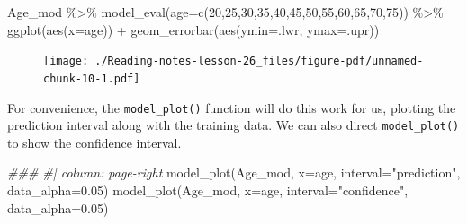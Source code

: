 \documentclass[
  letterpaper,
  DIV=11,
  numbers=noendperiod,
  oneside]{scrreprt}
\newenvironment{Shaded}{\begin{snugshade}}{\end{snugshade}}
\newcommand{\AttributeTok}[1]{\textcolor[rgb]{0.40,0.45,0.13}{#1}}
\newcommand{\DecValTok}[1]{\textcolor[rgb]{0.68,0.00,0.00}{#1}}
\newcommand{\DocumentationTok}[1]{\textcolor[rgb]{0.37,0.37,0.37}{\textit{#1}}}
\newcommand{\FloatTok}[1]{\textcolor[rgb]{0.68,0.00,0.00}{#1}}
\newcommand{\FunctionTok}[1]{\textcolor[rgb]{0.28,0.35,0.67}{#1}}
\newcommand{\NormalTok}[1]{\textcolor[rgb]{0.00,0.23,0.31}{#1}}
\newcommand{\SpecialCharTok}[1]{\textcolor[rgb]{0.37,0.37,0.37}{#1}}
\newcommand{\StringTok}[1]{\textcolor[rgb]{0.13,0.47,0.30}{#1}}
\begin{document}
\begin{tcolorbox}
\begin{Shaded}
\begin{Highlighting}[]
\NormalTok{Age\_mod }\SpecialCharTok{\%\textgreater{}\%} 
  \FunctionTok{model\_eval}\NormalTok{(}\AttributeTok{age=}\FunctionTok{c}\NormalTok{(}\DecValTok{20}\NormalTok{,}\DecValTok{25}\NormalTok{,}\DecValTok{30}\NormalTok{,}\DecValTok{35}\NormalTok{,}\DecValTok{40}\NormalTok{,}\DecValTok{45}\NormalTok{,}\DecValTok{50}\NormalTok{,}\DecValTok{55}\NormalTok{,}\DecValTok{60}\NormalTok{,}\DecValTok{65}\NormalTok{,}\DecValTok{70}\NormalTok{,}\DecValTok{75}\NormalTok{)) }\SpecialCharTok{\%\textgreater{}\%}
  \FunctionTok{ggplot}\NormalTok{(}\FunctionTok{aes}\NormalTok{(}\AttributeTok{x=}\NormalTok{age)) }\SpecialCharTok{+}
  \FunctionTok{geom\_errorbar}\NormalTok{(}\FunctionTok{aes}\NormalTok{(}\AttributeTok{ymin=}\NormalTok{.lwr, }\AttributeTok{ymax=}\NormalTok{.upr))}
\end{Highlighting}
\end{Shaded}

\begin{figure}[H]

{\centering \texttt{[image: ./Reading-notes-lesson-26\_files/figure-pdf/unnamed-chunk-10-1.pdf]}

}

\end{figure}

For convenience, the \texttt{model\_plot()} function will do this work
for us, plotting the prediction interval along with the training data.
We can also direct \texttt{model\_plot()} to show the confidence
interval.

\begin{Shaded}
\begin{Highlighting}[]
\DocumentationTok{\#\#\# \#| column: page{-}right}
\FunctionTok{model\_plot}\NormalTok{(Age\_mod, }\AttributeTok{x=}\NormalTok{age, }\AttributeTok{interval=}\StringTok{"prediction"}\NormalTok{, }\AttributeTok{data\_alpha=}\FloatTok{0.05}\NormalTok{)}
\FunctionTok{model\_plot}\NormalTok{(Age\_mod, }\AttributeTok{x=}\NormalTok{age, }\AttributeTok{interval=}\StringTok{"confidence"}\NormalTok{, }\AttributeTok{data\_alpha=}\FloatTok{0.05}\NormalTok{)}
\end{Highlighting}
\end{Shaded}

\begin{figure}[H]

\begin{minipage}[t]{0.50\linewidth}


\end{minipage}
\end{figure}
\end{tcolorbox}
\end{document}
